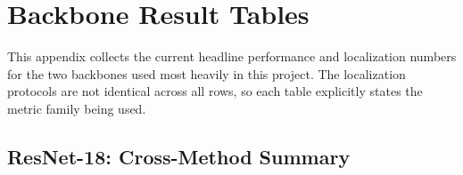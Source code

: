 \documentclass[11pt]{article}
\begin{document}
\section{Backbone Result Tables}
This appendix collects the current headline performance and localization numbers
for the two backbones used most heavily in this project. The localization
protocols are not identical across all rows, so each table explicitly states the
metric family being used.

\subsection{ResNet-18: Cross-Method Summary}
\begin{table}[h]
\centering
\small
{}
\caption{ResNet-18 cross-method summary. Localization numbers here are the
matched post-hoc Grad-CAM comparison from \texttt{docs/cub\_results.md}.}
\label{tab:r18-cross-method}
\end{table}
\end{document}
